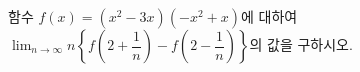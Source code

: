 함수 $f(x)=(x^2-3x)(-x^2+x)$에 대하여 $\displaystyle\lim_{n\to\infty} n\left\{f\left(2+\dfrac{1}{n}\right)-f\left(2-\dfrac{1}{n}\right)\right\}$의 값을 구하시오.
